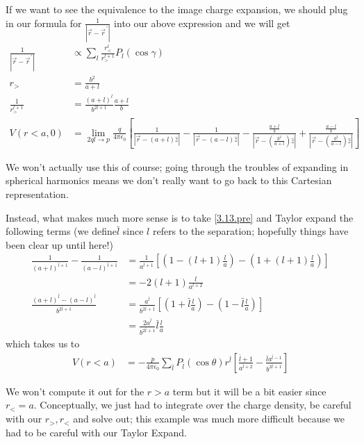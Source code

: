 \documentclass[10pt]{report}
\newcommand{\pvec}[1]{\vec{#1}^{\,\prime}}
\newcommand{\abs}[1]{\left|#1\right|}
\begin{document}
If we want to see the equivalence to the image charge expansion, we should plug in our formula for $\frac{1}{\abs{\vec{r} - \pvec{r}}}$ into our above expression and we will get
\begin{align}
    \frac{1}{\abs{\vec{r} - \pvec{r}}} &\propto \sum_{l}^{}\frac{r_<^l}{r_>^{l+1}}P_l(\cos\gamma)\\
    r_> &= \frac{b^2}{a+l}\\
    \frac{1}{r_>^{l+1}} &= \frac{(a+l)^l}{b^{2l+1}}\frac{a+l}{b}\\
    V(r<a,0) &= \lim_{2ql \to p} \frac{q}{4\pi\epsilon_0}\left[ \frac{1}{\abs{\vec{r} - (a+l)\hat{z}}} - \frac{1}{\abs{\vec{r} - (a-l)\hat{z}}} - \frac{\frac{a+l}{b}}{\abs{\vec{r} - \left( \frac{b^2}{a+l} \right)\hat{z}}} + \frac{\frac{a-l}{b}}{\abs{\vec{r} - \left( \frac{b^2}{a-l} \right)\hat{z}}} \right]
\end{align}

We won't actually use this of course; going through the troubles of expanding in spherical harmonics means we don't really want to go back to this Cartesian representation.

Instead, what makes much more sense is to take \eqref{3.13.pre} and Taylor expand the following terms (we define$\bar{l}$ since $l$ refers to the separation; hopefully things have been clear up until here!)
\begin{align}
    \frac{1}{(a+l)^{\bar{l}+1}} - \frac{1}{(a-l)^{\bar{l}+1}} &= \frac{1}{a^{\bar{l}+1}}\left[ \left( 1 - (l+1)\frac{l}{a} \right) - \left( 1 + (l+1)\frac{l}{a} \right) \right]\\
    &= -2(l+1)\frac{l}{a^{l+2}}\\
    \frac{(a+l)^{\bar{l}} - (a-l)^{\bar{l}}}{b^{2\bar{l}+1}} &= \frac{a^{\bar{l}}}{b^{2\bar{l}+1}}\left[ \left( 1 + \bar{l}\frac{l}{a} \right) - \left( 1 - \bar{l}\frac{l}{a} \right) \right]\\
    &= \frac{2a^{\bar{l}}}{b^{2\bar{l} + 1}}\bar{l}\frac{l}{a}
\end{align}
which takes us to
\begin{align}
    V(r<a) &= -\frac{p}{4\pi\epsilon_0}\sum_{\bar{l}}^{}P_{\bar{l}}(\cos\theta) r^{\bar{l}}\left[ \frac{\bar{l} + 1}{a^{\bar{l} + 2}} - \frac{\bar{l}a^{\bar{l} - 1}}{b^{2\bar{l} + 1}} \right]
\end{align}

We won't compute it out for the $r > a$ term but it will be a bit easier since $r_< = a$. Conceptually, we just had to integrate over the charge density, be careful with our $r_>, r_<$ and solve out; this example was much more difficult because we had to be careful with our Taylor Expand. 
\end{document}
